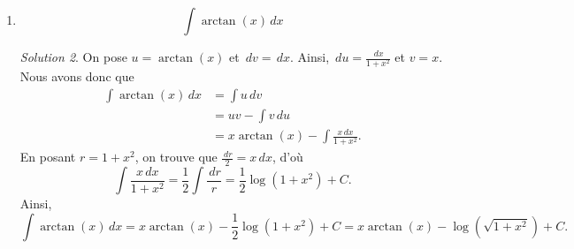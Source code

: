 \documentclass[
  12pt,
  letterpaper,
]{book}
\theoremstyle{remark}
\newtheorem*{solution}{Solution}
\begin{document}
\begin{enumerate}
\begin{solution}
  On pose \(u=e^x\) et \(\,dv=\sin(x)\,dx\). Ainsi, \(\,du=e^x\,dx\) et
  \(v=-\cos(x)\). Nous avons donc que \begin{align}
  \int e^x\sin(x)\,dx&=\int u\,dv \\
  &=uv-\int v\,du \\
  &=-e^x\cos(x)+\int e^x\cos(x)\,dx. \qquad(\star)
  \end{align} Il nous faut maintenant effectuer l'intégrale de la
  fonction \(e^x\cos(x)\). Encore une fois, on procède en utilisant la
  méthode d'intégration par parties. Posons \(r=e^x\) et
  \(\,ds=\cos(x)\,dx\). On obtient que \(\,dr=e^x\,dx\) et
  \(s=\sin(x)\). On a ainsi que \begin{align}
  \int e^x\cos(x)\,dx&=\int r\,ds \\
  &=rs-\int s\,dr \\
  &=e^x\sin(x)-\int e^x\sin(x)\,dx. \qquad(\star\star)
  \end{align} Nous voyons apparaître à nouveau l'intégrale qui est en
  fait l'inconnu de notre problème de départ. On pourrait penser que
  tout ce que nous avons fait dans ce problème jusqu'à présent est
  tourner en rond. Cependant, il n'en est rien de cela puisqu'en
  utilisant les équations \((\star)\) et \((\star\star)\), on obtient
  que \begin{align}
  \int e^x\sin(x)\,dx&=-e^x\cos(x)+\int e^x\cos(x)\,dx & \qquad(\text{d'après}(\star)) \\
  &=-e^x\cos(x)+e^x\sin(x)-\int e^x\sin(x)\,dx. & \qquad(\text{d'après}(\star\star))
  \end{align} Ainsi, \(2\int e^x\sin(x)\,dx=-e^x\cos(x)+e^x\sin(x)\),
  d'où
  \[\int e^x\sin(x)\,dx=\frac{e^x}{2}\left(\sin(x)-\cos(x)\right)+C.\]

  \end{solution}
\item
  \[\int\arctan(x)\,dx\]

  \begin{solution}

  On pose \(u=\arctan(x)\) et \(\,dv=\,dx\). Ainsi,
  \(\,du=\frac{\,dx}{1+x^2}\) et \(v=x\). Nous avons donc que
  \begin{align}
  \int\arctan(x)\,dx&=\int u\,dv \\
  &=uv-\int v\,du \\
  &=x\arctan(x)-\int \frac{x\,dx}{1+x^2}.
  \end{align} En posant \(r=1+x^2\), on trouve que
  \(\frac{\,dr}{2}=x\,dx\), d'où
  \[\int\frac{x\,dx}{1+x^2}=\frac{1}{2}\int\frac{\,dr}{r}=\frac{1}{2}\log(1+x^2)+C.\]
  Ainsi,
  \[\int\arctan(x)\,dx=x\arctan(x)-\frac{1}{2}\log(1+x^2)+C=x\arctan(x)-\log\left(\sqrt{1+x^2}\right)+C.\]


\end{solution}
\end{enumerate}
\end{document}

